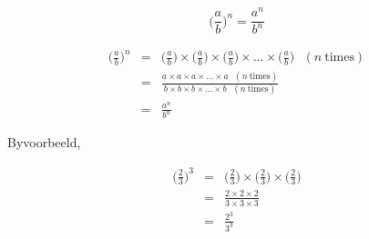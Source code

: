 

{
$$ \Big(\frac{a}{b}\Big)^n = \frac{a^n}{b^n} $$

\begin{eqnarray*}

 \Big(\frac{a}{b}\Big)^n & = & \Big(\frac{a}{b}\Big) \times \Big(\frac{a}{b}\Big) \times \Big(\frac{a}{b}\Big) \times \ldots \times \Big(\frac{a}{b}\Big) ~~~(n~\mbox{times}) \\
                         & = & \frac{a \times a \times a \times \ldots \times a ~~~(n~\mbox{times})}{b \times b \times b \times \ldots \times b ~~~(n~\mbox{times})}\\
                         & = & \frac{a^n}{b^n}
\end{eqnarray*}



}




Byvoorbeeld,

\begin{eqnarray*}

\Big(\frac{2}{3}\Big)^3 & = & \Big(\frac{2}{3}\Big) \times  \Big(\frac{2}{3}\Big) \times \Big(\frac{2}{3}\Big) \\
                        & = & \frac{2 \times 2 \times 2}{3 \times 3 \times 3} \\
		        & = & \frac{2^3}{3^3}




\end{eqnarray*}







            

